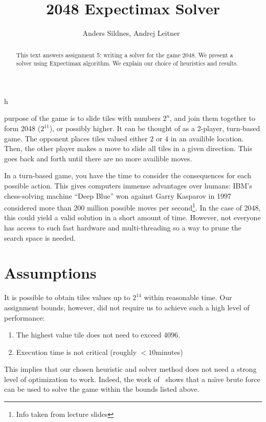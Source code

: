 \documentclass[journal]{IEEEtran}
\def\naive{na\"{\i}ve}
\begin{document}
%
\title{2048 Expectimax Solver}

\author{Anders Sildnes, Andrej Leitner~%
}%

%
{h}

\maketitle

\begin{abstract}
    This text answers assignment 5: writing a solver for the game 2048.
    We present a solver using Expectimax algorithm. We explain our choice of
    heuristics and results.
\end{abstract}

 purpose of the game is to slide tiles with numbers
$2^{n}$, and join them together to form 2048 ($2^{11}$), or possibly higher.
It can be thought of as a 2-player, turn-based game. 
The opponent places tiles valued either $2$ or $4$ in an availible location.
Then,
the other player makes a move to slide all tiles in a given direction. This
goes back and forth until there are no more availible moves.

In a turn-based game, you have the time to consider the consequences for each possible
action. This gives computers immense advantages over humans:
IBM's chess-solving machine ``Deep Blue'' won against Garry Kasparov in 1997 considered more than
200 million possible moves per second\footnote{Info taken from lecture slides}.
In the case of 2048, this could yield a valid solution in a short amount of
time. However, not everyone has access to such fast hardware and
multi-threading so a way to prune the search space is needed.

\section*{Assumptions}
It is possible to obtain tiles values up to $2^{14}$ within reasonable time.
Our assignment bounds, however, did not require us to achieve such a high level
of performance:
\begin{enumerate}
    \item The highest value tile does not need to exceed 4096.
    \item Execution time is not critical (roughly $< 10$minutes)
\end{enumerate}
This implies that our chosen heuristic and solver method does not need a strong
level of optimization to work. Indeed, the work of~\cite{brutesolver} shows that
a \naive{} brute force can be used to solve the game within the bounds listed above.
\end{document}
